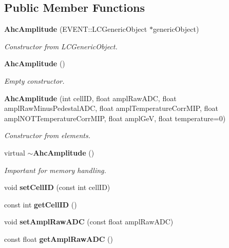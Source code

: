 \subsection*{Public Member Functions}
\begin{DoxyCompactItemize}
\item 
{\bf Ahc\-Amplitude} (E\-V\-E\-N\-T\-::\-L\-C\-Generic\-Object $\ast$generic\-Object)
\begin{DoxyCompactList}\small\item\em Constructor from L\-C\-Generic\-Object. \end{DoxyCompactList}\item 
{\bf Ahc\-Amplitude} ()
\begin{DoxyCompactList}\small\item\em Empty constructor. \end{DoxyCompactList}\item 
{\bf Ahc\-Amplitude} (int cell\-I\-D, float ampl\-Raw\-A\-D\-C, float ampl\-Raw\-Minus\-Pedestal\-A\-D\-C, float ampl\-Temperature\-Corr\-M\-I\-P, float ampl\-N\-O\-T\-Temperature\-Corr\-M\-I\-P, float ampl\-Ge\-V, float temperature=0)
\begin{DoxyCompactList}\small\item\em Constructor from elements. \end{DoxyCompactList}\item 
virtual {\bf $\sim$\-Ahc\-Amplitude} ()\label{classCALICE_1_1AhcAmplitude_a9098e06a99ede647985f9740bea488c9}

\begin{DoxyCompactList}\small\item\em Important for memory handling. \end{DoxyCompactList}\item 
void {\bfseries set\-Cell\-I\-D} (const int cell\-I\-D)\label{classCALICE_1_1AhcAmplitude_af30305bc770835cef1e85b52861a8d77}

\item 
const int {\bfseries get\-Cell\-I\-D} ()\label{classCALICE_1_1AhcAmplitude_a8ba74fcf68e917e51fe0815c1ff81583}

\item 
void {\bfseries set\-Ampl\-Raw\-A\-D\-C} (const float ampl\-Raw\-A\-D\-C)\label{classCALICE_1_1AhcAmplitude_a1bf9f7c2837899af1ef2df59ef94866b}

\item 
const float {\bfseries get\-Ampl\-Raw\-A\-D\-C} ()\label{classCALICE_1_1AhcAmplitude_a367d193df67de6046af58982ccb6e2ba}


\end{DoxyCompactItemize}
